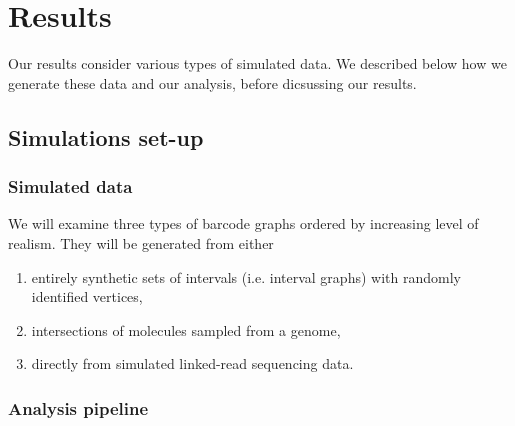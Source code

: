 \documentclass[a4paper,UKenglish,cleveref, autoref, thm-restate,authorcolumns]{lipics-v2019}
\begin{document}



\section{Results}

Our results consider various types of simulated data. We described below how we generate these data and our analysis, before dicsussing our results.

\subsection{Simulations set-up}

\subsubsection*{Simulated data}

We will examine three types of barcode graphs ordered by increasing level of realism. They will be generated from either
\begin{enumerate}
\item entirely synthetic sets of intervals (i.e. interval graphs) with randomly identified vertices,
\item intersections of molecules sampled from a genome, 
\item directly from simulated linked-read sequencing data.
\end{enumerate}

\subsubsection*{Analysis pipeline}

%
\end{document}
